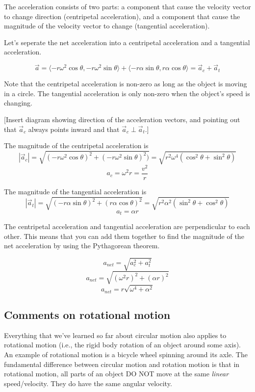 The acceleration consists of two parts: a component that cause the velocity vector to change direction (centripetal acceleration), and a component that cause the magnitude of the velocity vector to change (tangential acceleration).

Let's seperate the net acceleration into a centripetal acceleration and a tangential acceleration.

$$\vec a=\langle{-r\omega^2\cos\theta,-r\omega^2\sin\theta}\rangle+\langle{-r\alpha\sin\theta,r\alpha\cos\theta}\rangle=\vec{a}_c+\vec{a}_t$$

Note that the centripetal acceleration is non-zero as long as the object is moving in a circle. The tangential acceleration is only non-zero when the object's speed is changing.

[Insert diagram showing direction of the acceleration vectors, and pointing out that $\vec{a}_c$ always points inward and that $\vec{a}_c\perp\vec{a}_t$.]
\vspace{5cm}

The magnitude of the centripetal acceleration is
$$|\vec{a}_c|=\sqrt{(-r\omega^2\cos\theta)^2+(-r\omega^2\sin\theta)^2)}=\sqrt{r^2\omega^4(\cos^2\theta+\sin^2\theta)}$$
$$\boxed{a_c=\omega^2r=\frac{v^2}{r}}$$

The magnitude of the tangential acceleration is
$$|\vec{a}_t|=\sqrt{(-r\alpha\sin\theta)^2+(r\alpha\cos\theta)^2}=\sqrt{r^2\alpha^2(\sin^2\theta+\cos^2\theta)}$$
$$\boxed{a_t=\alpha r}$$

The centripetal acceleration and tangential acceleration are perpendicular to each other. This means that you can add them together to find the magnitude of the net acceleration by using the Pythagorean theorem.

$$a_{net}=\sqrt{a_c^2+a_t^2}$$
$$a_{net}=\sqrt{(\omega^2 r)^2+(\alpha r)^2}$$
$$\boxed{a_{net}=r\sqrt{\omega^4+\alpha^2}}$$

\subsection{Comments on rotational motion}
Everything that we've learned so far about circular motion also applies to rotational motion (i.e., the rigid body rotation of an object around some axis). An example of rotational motion is a bicycle wheel spinning around its axle. The fundamental difference between circular motion and rotation motion is that in rotational motion, all parts of an object DO NOT move at the same \textit{linear} speed/velocity. They do have the same angular velocity.

